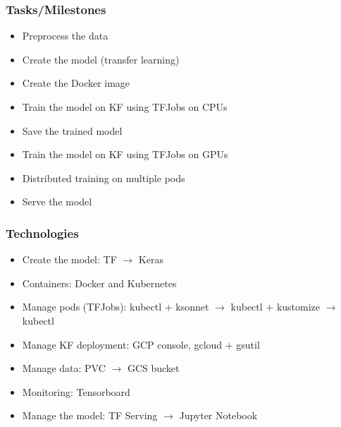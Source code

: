\documentclass[aspectratio=169]{beamer}
\begin{document}

\begin{frame}
\frametitle{Tasks/Milestones}

\begin{itemize}
	\item Preprocess the data
	\item Create the model (transfer learning)\\
	\item Create the Docker image\\
	\item Train the model on KF using TFJobs on CPUs\\
	\item Save the trained model\\
	\item Train the model on KF using TFJobs on GPUs\\
	\item Distributed training on multiple pods\\
	\item Serve the model
\end{itemize}

\end{frame}


\begin{frame}
\frametitle{Technologies}

\begin{itemize}
	\item Create the model: TF $\rightarrow$ Keras
	\item Containers: Docker and Kubernetes
	\item Manage pods (TFJobs): kubectl + ksonnet $\rightarrow$ kubectl + kustomize $\rightarrow$ kubectl
	\item Manage KF deployment: GCP console, gcloud + gsutil
	\item Manage data: PVC $\rightarrow$ GCS bucket
	\item Monitoring: Tensorboard
	\item Manage the model: TF Serving $\rightarrow$ Jupyter Notebook
\end{itemize}

\end{frame}

\end{document}
